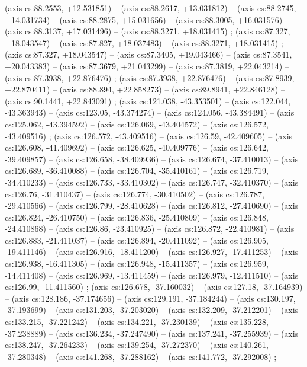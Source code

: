     (axis cs:88.2553,    +12.531851) --  (axis cs:88.2617,    +13.031812) --  (axis cs:88.2745,    +14.031734) --  (axis cs:88.2875,    +15.031656) --  (axis cs:88.3005,    +16.031576) --  (axis cs:88.3137,    +17.031496) --  (axis cs:88.3271,    +18.031415) ;
    (axis cs:87.327,    +18.043547) --  (axis cs:87.827,    +18.037483) --  (axis cs:88.3271,    +18.031415) ;
    (axis cs:87.327,    +18.043547) --  (axis cs:87.3405,    +19.043466) --  (axis cs:87.3541,    +20.043383) --  (axis cs:87.3679,    +21.043299) --  (axis cs:87.3819,    +22.043214) --  (axis cs:87.3938,    +22.876476) ;
    (axis cs:87.3938,    +22.876476) --  (axis cs:87.8939,    +22.870411) --  (axis cs:88.894,    +22.858273) --  (axis cs:89.8941,    +22.846128) --  (axis cs:90.1441,    +22.843091) ;
    (axis cs:121.038,    -43.353501) --  (axis cs:122.044,    -43.363943) --  (axis cs:123.05,    -43.374274) --  (axis cs:124.056,    -43.384491) --  (axis cs:125.062,    -43.394592) --  (axis cs:126.069,    -43.404572) --  (axis cs:126.572,    -43.409516) ;
    (axis cs:126.572,    -43.409516) --  (axis cs:126.59,    -42.409605) --  (axis cs:126.608,    -41.409692) --  (axis cs:126.625,    -40.409776) --  (axis cs:126.642,    -39.409857) --  (axis cs:126.658,    -38.409936) --  (axis cs:126.674,    -37.410013) --  (axis cs:126.689,    -36.410088) --  (axis cs:126.704,    -35.410161) --  (axis cs:126.719,    -34.410233) --  (axis cs:126.733,    -33.410302) --  (axis cs:126.747,    -32.410370) --  (axis cs:126.76,    -31.410437) --  (axis cs:126.774,    -30.410502) --  (axis cs:126.787,    -29.410566) --  (axis cs:126.799,    -28.410628) --  (axis cs:126.812,    -27.410690) --  (axis cs:126.824,    -26.410750) --  (axis cs:126.836,    -25.410809) --  (axis cs:126.848,    -24.410868) --  (axis cs:126.86,    -23.410925) --  (axis cs:126.872,    -22.410981) --  (axis cs:126.883,    -21.411037) --  (axis cs:126.894,    -20.411092) --  (axis cs:126.905,    -19.411146) --  (axis cs:126.916,    -18.411200) --  (axis cs:126.927,    -17.411253) --  (axis cs:126.938,    -16.411305) --  (axis cs:126.948,    -15.411357) --  (axis cs:126.959,    -14.411408) --  (axis cs:126.969,    -13.411459) --  (axis cs:126.979,    -12.411510) --  (axis cs:126.99,    -11.411560) ;
    (axis cs:126.678,    -37.160032) --  (axis cs:127.18,    -37.164939) --  (axis cs:128.186,    -37.174656) --  (axis cs:129.191,    -37.184244) --  (axis cs:130.197,    -37.193699) --  (axis cs:131.203,    -37.203020) --  (axis cs:132.209,    -37.212201) --  (axis cs:133.215,    -37.221242) --  (axis cs:134.221,    -37.230139) --  (axis cs:135.228,    -37.238889) --  (axis cs:136.234,    -37.247490) --  (axis cs:137.241,    -37.255939) --  (axis cs:138.247,    -37.264233) --  (axis cs:139.254,    -37.272370) --  (axis cs:140.261,    -37.280348) --  (axis cs:141.268,    -37.288162) --  (axis cs:141.772,    -37.292008) ;
  
